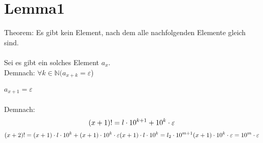 \documentclass[12pt, letterpaper]{article}
\begin{document}
\section{Lemma1}
Theorem: Es gibt kein Element, nach dem alle nachfolgenden Elemente gleich sind.
\\\\
Sei es gibt ein solches Element $a_{x}$.
\\
Demnach: $\forall k \in \mathbb{N}(a_{x+k}=\varepsilon$)
\\\\
$a_{x+1} = \varepsilon$\\
\\Demnach: \[  
  (x+1)! = l\cdot 10^{k+1} + 10^{k}\cdot \varepsilon\\
\]
\[  
  
  (x+2)! = (x+1)\cdot l\cdot 10^{k}+(x+1)\cdot 10^{k}\cdot \varepsilon\\
  (x+1)\cdot l\cdot 10^{k}= l_{2}\cdot 10^{m+1}\\
  (x+1)\cdot 10^{k}\cdot \varepsilon = 10^{m}\cdot \varepsilon\\

\]
\end{document}
